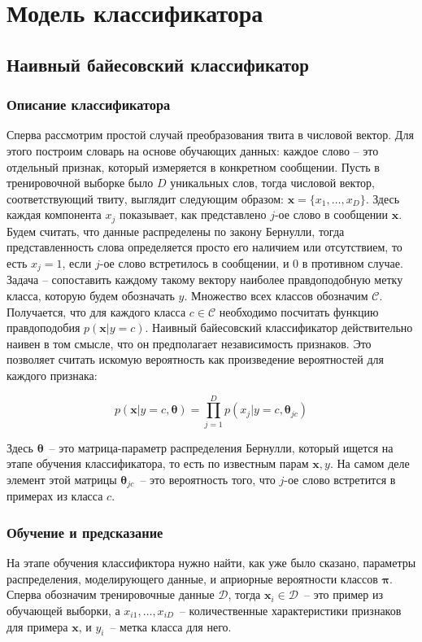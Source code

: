 \section{Модель классификатора}
\subsection{Наивный байесовский классификатор}
\subsubsection{Описание классификатора}
Сперва рассмотрим простой случай преобразования твита в числовой вектор. Для этого построим словарь
на основе обучающих данных: каждое слово -- это отдельный признак,
который измеряется в конкретном сообщении. Пусть в тренировочной выборке было $D$ уникальных слов,
тогда числовой вектор, соответствующий твиту, выглядит следующим образом:
$\mathbf{x} = \{x_1,\ldots,x_D \}$. Здесь каждая компонента $x_j$ показывает, как представлено
$j$-ое слово в сообщении $\mathbf{x}$. Будем считать, что данные распределены по закону Бернулли, тогда
представленность слова определяется просто его наличием или отсутствием, то есть $x_j = 1$, если
$j$-ое слово встретилось в сообщении, и $0$ в противном случае. Задача -- сопоставить каждому такому
вектору наиболее правдоподобную метку класса, которую будем обозначать $y$. Множество всех классов
обозначим $\mathcal{C}$. Получается, что для каждого класса $c \in \mathcal{C}$ необходимо посчитать
функцию правдоподобия $p(\mathbf{x}|y=c)$. Наивный байесовский классификатор действительно наивен в
том смысле, что он предполагает независимость признаков. Это позволяет считать искомую вероятность
как произведение вероятностей для каждого признака:

\begin{equation}
  p(\mathbf{x}|y=c,\mathbf{\theta}) = \prod_{j=1}^Dp(x_j|y=c,\mathbf{\theta}_{jc})
  \label{eq:nbprob}
\end{equation}

Здесь $\mathbf{\theta}$~-- это матрица-параметр распределения Бернулли, который ищется на этапе
обучения классификатора, то есть по известным парам $\mathbf{x}, y$. На самом деле элемент этой
матрицы  $\mathbf{\theta}_{jc}$~-- это вероятность того, что $j$-ое слово встретится в примерах из класса $c$.


\subsubsection{Обучение и предсказание}
На этапе обучения классификтора нужно найти, как уже было сказано, параметры распределения,
моделирующего данные, и априорные вероятности классов $\mathbf{\pi}$. Сперва обозначим тренировочные
данные $\mathcal{D}$, тогда $\mathbf{x}_i \in \mathcal{D}$~-- это пример из обучающей выборки, а
$x_{i1},\ldots,x_{iD}$~-- количественные характеристики признаков для примера $\mathbf{x}$, и $y_i$~-- метка класса для него.

